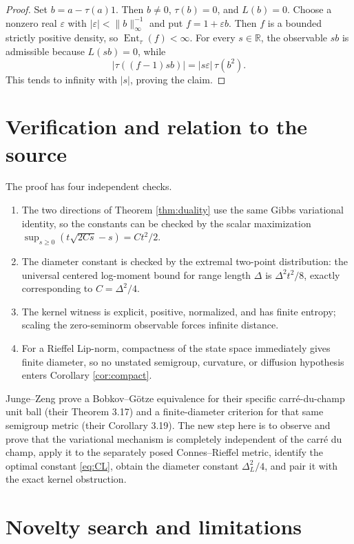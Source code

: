 \documentclass[11pt]{article}
\DeclareMathOperator{\Ent}{Ent}
\begin{document}
\begin{proof}
Set $b=a-\tau(a)1$.  Then $b\neq0$, $\tau(b)=0$, and $L(b)=0$.  Choose a
nonzero real $\varepsilon$ with
$|\varepsilon|<\|b\|_\infty^{-1}$ and put $f=1+\varepsilon b$.  Then $f$ is a
bounded strictly positive density, so $\Ent_\tau(f)<\infty$.  For every
$s\in\mathbb R$, the observable $sb$ is admissible because $L(sb)=0$, while
\[
 |\tau((f-1)sb)|=|s\varepsilon|\,\tau(b^2).
\]
This tends to infinity with $|s|$, proving the claim.
\end{proof}

\section*{Verification and relation to the source}

The proof has four independent checks.
\begin{enumerate}
\item The two directions of Theorem \ref{thm:duality} use the same Gibbs
variational identity, so the constants can be checked by the scalar maximization
$\sup_{s\geq0}(t\sqrt{2Cs}-s)=Ct^2/2$.
\item The diameter constant is checked by the extremal two-point distribution:
the universal centered log-moment bound for range length $\Delta$ is
$\Delta^2t^2/8$, exactly corresponding to $C=\Delta^2/4$.
\item The kernel witness is explicit, positive, normalized, and has finite
entropy; scaling the zero-seminorm observable forces infinite distance.
\item For a Rieffel Lip-norm, compactness of the state space immediately gives
finite diameter, so no unstated semigroup, curvature, or diffusion hypothesis
enters Corollary \ref{cor:compact}.
\end{enumerate}

Junge--Zeng prove a Bobkov--G\"otze equivalence for their specific
carr\'e-du-champ unit ball (their Theorem 3.17) and a finite-diameter criterion
for that same semigroup metric (their Corollary 3.19).  The new step here is to
observe and prove that the variational mechanism is completely independent of
the carr\'e du champ, apply it to the separately posed Connes--Rieffel metric,
identify the optimal constant \eqref{eq:CL}, obtain the diameter constant
$\Delta_L^2/4$, and pair it with the exact kernel obstruction.

\section*{Novelty search and limitations}
\end{document}
